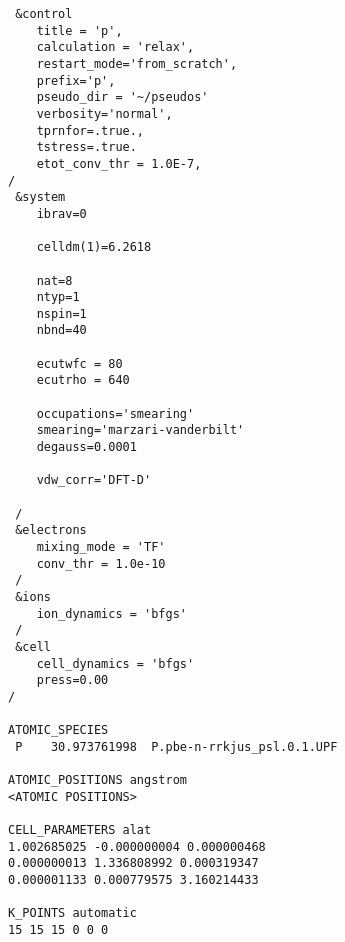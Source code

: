 \begin{lstlisting}
 &control
    title = 'p',
    calculation = 'relax',
    restart_mode='from_scratch',
    prefix='p',
    pseudo_dir = '~/pseudos'
    verbosity='normal',
    tprnfor=.true.,
    tstress=.true.
    etot_conv_thr = 1.0E-7,  
/
 &system
    ibrav=0

    celldm(1)=6.2618

    nat=8
    ntyp=1
    nspin=1
    nbnd=40 

    ecutwfc = 80
    ecutrho = 640

    occupations='smearing'
    smearing='marzari-vanderbilt'
    degauss=0.0001

    vdw_corr='DFT-D'
 
 /
 &electrons
    mixing_mode = 'TF'
    conv_thr = 1.0e-10
 /
 &ions
    ion_dynamics = 'bfgs'
 /
 &cell
    cell_dynamics = 'bfgs'
    press=0.00 
/

ATOMIC_SPECIES
 P    30.973761998  P.pbe-n-rrkjus_psl.0.1.UPF

ATOMIC_POSITIONS angstrom
<ATOMIC POSITIONS>

CELL_PARAMETERS alat
1.002685025 -0.000000004 0.000000468
0.000000013 1.336808992 0.000319347
0.000001133 0.000779575 3.160214433

K_POINTS automatic
15 15 15 0 0 0
\end{lstlisting}
